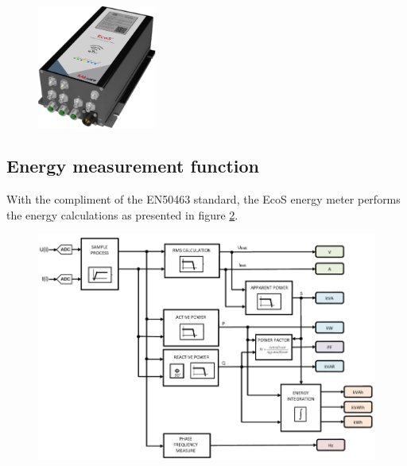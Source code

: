 \begin{figure}[h!]
	\centering
	\begin{minipage}{.8\textwidth}
		\centering
		\includegraphics[width=0.35\textwidth,keepaspectratio]{figures/32.EnergyS/ecos}
		\label{fig:ecos}
	\end{minipage}
\end{figure}

	\newpage
	
\subsection{Energy measurement function}
\label{subs:324}

With the compliment of the EN50463 standard, the EcoS energy meter performs the energy calculations as presented in figure \ref{fig:energy_calculation}.

\begin{figure}[h!]
	\centering
	\begin{minipage}{.8\textwidth}
		\centering
		\vspace{-0.5em}
		\includegraphics[width=\textwidth,keepaspectratio]{figures/32.EnergyS/energy_calculation}
		\label{fig:energy_calculation}
				\vspace{-1em}
	\end{minipage}
\end{figure}

